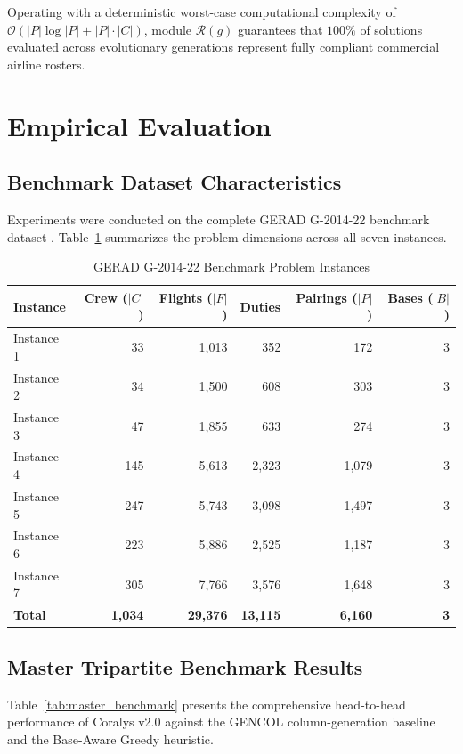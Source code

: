 \documentclass[journal]{IEEEtran}
\begin{document}
Operating with a deterministic worst-case computational complexity of $\mathcal{O}(|P| \log |P| + |P| \cdot |C|)$, module $\mathcal{R}(g)$ guarantees that $100\%$ of solutions evaluated across evolutionary generations represent fully compliant commercial airline rosters.

\section{Empirical Evaluation}

\subsection{Benchmark Dataset Characteristics}

Experiments were conducted on the complete GERAD G-2014-22 benchmark dataset \cite{kasirzadeh2017}. Table~\ref{tab:dataset} summarizes the problem dimensions across all seven instances.

\begin{table}[htbp]
\caption{GERAD G-2014-22 Benchmark Problem Instances}
\label{tab:dataset}
\centering
\begin{tabular}{lrrrrr}
\toprule
Instance & Crew ($|C|$) & Flights ($|F|$) & Duties & Pairings ($|P|$) & Bases ($|B|$) \\
\midrule
Instance 1 & 33 & 1,013 & 352 & 172 & 3 \\
Instance 2 & 34 & 1,500 & 608 & 303 & 3 \\
Instance 3 & 47 & 1,855 & 633 & 274 & 3 \\
Instance 4 & 145 & 5,613 & 2,323 & 1,079 & 3 \\
Instance 5 & 247 & 5,743 & 3,098 & 1,497 & 3 \\
Instance 6 & 223 & 5,886 & 2,525 & 1,187 & 3 \\
Instance 7 & 305 & 7,766 & 3,576 & 1,648 & 3 \\
\midrule
\textbf{Total} & \textbf{1,034} & \textbf{29,376} & \textbf{13,115} & \textbf{6,160} & \textbf{3} \\
\bottomrule
\end{tabular}
\end{table}

\subsection{Master Tripartite Benchmark Results}

Table~\ref{tab:master_benchmark} presents the comprehensive head-to-head performance of Coralys v2.0 against the GENCOL column-generation baseline \cite{kasirzadeh2017} and the Base-Aware Greedy heuristic.
\end{document}
